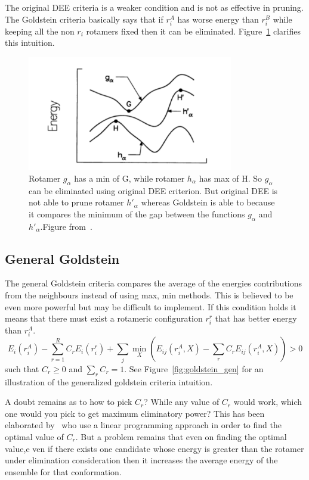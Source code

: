 \documentclass{article}
\begin{document}
The original DEE criteria is a weaker condition and is not as effective in pruning. The Goldstein criteria basically says that if $r_i^A$ has worse energy than $r_i^B$ while keeping all the non $r_i$ rotamers fixed then it can be eliminated. Figure~\ref{fig:goldstein} clarifies this intuition. 

\begin{figure}[h!]
    \centering
    \includegraphics[width=0.8\textwidth]{pics/gold1.pdf}
    \caption{Rotamer $g_\alpha$ has a min of G, while rotamer $h_\alpha$ has max of H. So $g_\alpha$ can be eliminated using original DEE criterion. But original DEE is not able to prune rotamer $h'_{\alpha}$ whereas Goldstein is able to because it compares the minimum of the gap between the functions $g_\alpha$ and $h'_\alpha$.Figure from~\cite{Goldstein1994}.}
    \label{fig:goldstein}
\end{figure}

\pagebreak

\subsection{General Goldstein}
The general Goldstein criteria compares the average of the energies contributions from the neighbours instead of using max, min methods. This is believed to be even more powerful but may be difficult to implement. If this condition holds it means that there must exist a rotameric configuration $r_i^r$ that has better energy than $r_i^A$.
\[
E_i(r_i^A)-\sum_{r=1}^R C_r E_i(r_i^r) + \sum_j \min_X \left( E_{ij}(r_i^A,X) - \sum_r C_rE_{ij}(r_i^A,X) \right) >0
\]
such that $C_r \geq 0$ and $\sum_r C_r=1$. See Figure~\ref{fig:goldstein_gen} for an illustration of the generalized goldstein criteria intuition. 

 A doubt remains as to how to pick $C_r$? While any value of $C_r$ would work, which one would you pick to get maximum eliminatory power? This has been elaborated by~\cite{Lasters1995} who use a linear programming approach in order to find the optimal value of $C_r$. But a problem remains that even on finding the optimal value,e ven if there exists one candidate whose energy is greater than the rotamer under elimination consideration then it increases the average energy of the ensemble for that conformation.
\end{document}
